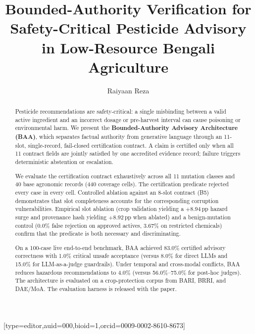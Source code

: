 \documentclass[a4paper,fleqn]{cas-dc}
\begin{document}
\let\WriteBookmarks\relax


\title [mode = title]{Bounded-Authority Verification for Safety-Critical Pesticide Advisory in Low-Resource Bengali Agriculture}

\author[1]{Raiyaan Reza}[type=editor,auid=000,bioid=1,orcid=0009-0002-8610-8673]
\cormark[1]

\address[1]{Department of Computer Science and Engineering, North South University, Dhaka 1229, Bangladesh}


\begin{abstract}
Pesticide recommendations are safety-critical: a single misbinding between a valid active ingredient and an incorrect dosage or pre-harvest interval can cause poisoning or environmental harm. We present the \textbf{Bounded-Authority Advisory Architecture (BAA)}, which separates factual authority from generative language through an 11-slot, single-record, fail-closed certification contract. A claim is certified only when all 11 contract fields are jointly satisfied by one accredited evidence record; failure triggers deterministic abstention or escalation.

We evaluate the certification contract exhaustively across all 11 mutation classes and 40 base agronomic records (440 coverage cells). The certification predicate rejected every case in every cell. Controlled ablation against an 8-slot contract (B5) demonstrates that slot completeness accounts for the corresponding corruption vulnerabilities. Empirical slot ablation (crop validation yielding a $+$8.94\,pp hazard surge and provenance hash yielding $+$8.92\,pp when ablated) and a benign-mutation control (0.0\% false rejection on approved actives, 3.67\% on restricted chemicals) confirm that the predicate is both necessary and discriminating.

On a 100-case live end-to-end benchmark, BAA achieved 83.0\% certified advisory correctness with 1.0\% critical unsafe acceptance (versus 8.0\% for direct LLMs and 15.0\% for LLM-as-a-judge guardrails). Under temporal and cross-modal conflicts, BAA reduces hazardous recommendations to 4.0\% (versus 56.0\%--75.0\% for post-hoc judges). The architecture is evaluated on a crop-protection corpus from BARI, BRRI, and DAE/MoA. The evaluation harness is released with the paper.
\end{abstract}
\end{document}
